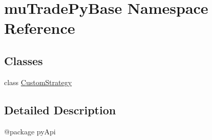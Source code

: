 \hypertarget{namespacemuTradePyBase}{\section{mu\-Trade\-Py\-Base Namespace Reference}
\label{namespacemuTradePyBase}
}
\subsection*{Classes}
\begin{DoxyCompactItemize}
\item 
class \hyperlink{classmuTradePyBase_1_1CustomStrategy}{Custom\-Strategy}
\end{DoxyCompactItemize}


\subsection{Detailed Description}
\begin{DoxyVerb}@package pyApi
\end{DoxyVerb}
 